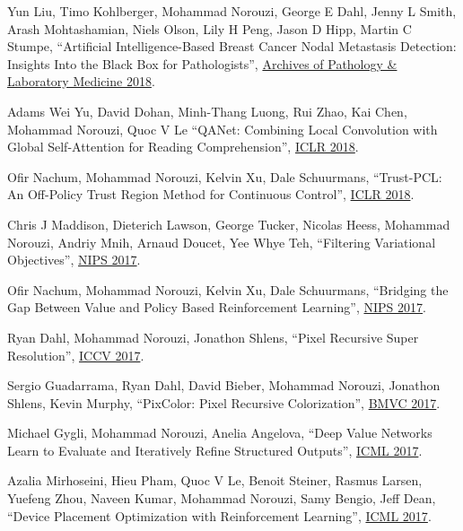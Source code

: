 \documentclass[10pt,letterpaper]{article}
\renewenvironment{itemize}{
  \begin{list}{}{
    \setlength{\leftmargin}{1.5em}
  }
}{
  \end{list}
}
\begin{document}
\begin{itemize}
\item Yun Liu, Timo Kohlberger, Mohammad Norouzi, George E Dahl, Jenny L Smith, Arash Mohtashamian, Niels Olson, Lily H Peng, Jason D Hipp, Martin C Stumpe,
``Artificial Intelligence-Based Breast Cancer Nodal Metastasis Detection: Insights Into the Black Box for Pathologists'',
\href{http://www.archivesofpathology.org/doi/pdf/10.5858/arpa.2018-0147-OA}
{Archives of Pathology \& Laboratory Medicine 2018}.

\item Adams Wei Yu, David Dohan, Minh-Thang Luong, Rui Zhao, Kai Chen, Mohammad Norouzi, Quoc V Le
``QANet: Combining Local Convolution with Global Self-Attention for Reading Comprehension'',
\href{https://arxiv.org/pdf/1804.09541.pdf}%
{ICLR 2018}.

\item Ofir Nachum, Mohammad Norouzi, Kelvin Xu, Dale Schuurmans,
``Trust-PCL: An Off-Policy Trust Region Method for Continuous Control'',
\href{https://arxiv.org/pdf/1707.01891}%
{ICLR 2018}.

\item Chris J Maddison, Dieterich Lawson, George Tucker, Nicolas Heess, Mohammad Norouzi, Andriy Mnih, Arnaud Doucet, Yee Whye Teh,
``Filtering Variational Objectives'',
\href{https://arxiv.org/pdf/1705.09279}%
{NIPS 2017}.

\item Ofir Nachum, Mohammad Norouzi, Kelvin Xu, Dale Schuurmans,
``Bridging the Gap Between Value and Policy Based Reinforcement Learning'',
\href{https://arxiv.org/pdf/1702.08892}%
{NIPS 2017}.

\item Ryan Dahl, Mohammad Norouzi, Jonathon Shlens,
``Pixel Recursive Super Resolution'',
\href{https://arxiv.org/pdf/1702.00783}%
{ICCV 2017}.

\item Sergio Guadarrama, Ryan Dahl, David Bieber, Mohammad Norouzi, Jonathon Shlens, Kevin Murphy,
``PixColor: Pixel Recursive Colorization'',
\href{https://arxiv.org/pdf/1705.07208}%
{BMVC 2017}.

\item Michael Gygli, Mohammad Norouzi, Anelia Angelova,
``Deep Value Networks Learn to Evaluate and Iteratively Refine Structured Outputs'',
\href{https://arxiv.org/pdf/1703.04363}%
{ICML 2017}.

\item Azalia Mirhoseini, Hieu Pham, Quoc V Le, Benoit Steiner, Rasmus Larsen, Yuefeng Zhou, Naveen Kumar, Mohammad Norouzi, Samy Bengio, Jeff Dean,
``Device Placement Optimization with Reinforcement Learning'',
\href{https://arxiv.org/pdf/1706.04972.pdf}%
{ICML 2017}.


\end{itemize}
\end{document}
